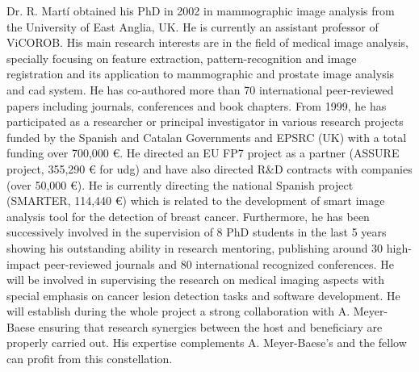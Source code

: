 Dr. R. Mart\'i obtained his PhD in 2002 in mammographic image analysis from the University of East Anglia, UK.
He is currently an assistant professor of ViCOROB.
His main research interests are in the field of medical image analysis, specially focusing on feature extraction, pattern-recognition and image registration and its application to mammographic and prostate image analysis and \ac{cad} system.
He has co-authored more than 70 international peer-reviewed papers including journals, conferences and book chapters.
From 1999, he has participated as a researcher or principal investigator in various research projects funded by the Spanish and Catalan Governments and EPSRC (UK) with a total funding over 700,000 \euro{}.
He directed an EU FP7 project as a partner (ASSURE project, 355,290 \euro{} for \ac{udg}) and have also directed R\&D contracts with companies (over 50,000 \euro{}).
He is currently directing the national Spanish project (SMARTER, 114,440 \euro{}) which is related to the development of smart image analysis tool for the detection of breast cancer.
Furthermore, he has been successively involved in the supervision of 8 PhD students in the last 5 years showing his outstanding ability in research mentoring, publishing around 30 high-impact peer-reviewed journals and 80 international recognized conferences.
He will be involved in supervising the research on medical imaging aspects with special emphasis on cancer lesion detection tasks and software development.
He will establish during the whole project a strong collaboration with A. Meyer-Baese ensuring that research synergies between the host and beneficiary are properly carried out. 
His expertise complements A. Meyer-Baese's and the fellow can profit from this constellation.




